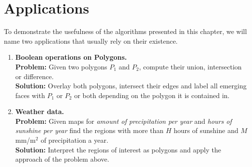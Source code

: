 \section{Applications}
    To demonstrate the usefulness of the algorithms presented in this chapter, we will name two applications that usually rely on their existence.
    \begin{enumerate}
        \item \textbf{Boolean operations on Polygons.} \\
        \textbf{Problem:} Given two polygons $P_1$ and $P_2$, compute their union, intersection or difference. \\
        \textbf{Solution:} Overlay both polygons, intersect their edges and label all emerging faces with $P_1$ or $P_2$ or both depending on the polygon it is contained in. 
        
        \item \textbf{Weather data.} \\ 
        \textbf{Problem:} Given maps for \emph{amount of precipitation per year} and \emph{hours of sunshine per year} find the regions with more than $H$ hours of sunshine and $M$ mm/m$^2$ of precipitation a year. \\
        \textbf{Solution:} Interpret the regions of interest as polygons and apply the approach of the problem above.
    \end{enumerate}

